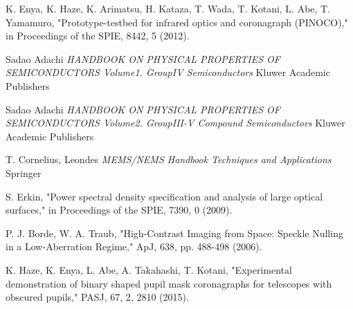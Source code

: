 \documentclass[a4paper]{article}
\begin{document}
\begin{thebibliography}{99}
K. Enya, K. Haze, K. Arimatsu, H. Kataza, T. Wada, T. Kotani, L. Abe, T. Yamamuro, "Prototype-testbed for infrared optics and coronagraph (PINOCO)," in Proceedings of the SPIE, 8442, 5 (2012).

Sadao Adachi
\textit{HANDBOOK ON PHYSICAL PROPERTIES OF SEMICONDUCTORS Volume1. GroupI\hspace{-.1em}V Semiconductors}
Kluwer Academic Publishers

Sadao Adachi
\textit{HANDBOOK ON PHYSICAL PROPERTIES OF SEMICONDUCTORS Volume2. GroupI\hspace{-.1em}I\hspace{-.1em}I-V Compound Semiconductors}
Kluwer Academic Publishers

T. Cornelius, Leondes
\textit{MEMS/NEMS Handbook Techniques and Applications}
Springer

S. Erkin, "Power spectral density specification and analysis of large optical surfaces," in Proceedings of the SPIE, 7390, 0 (2009).

P. J. Borde, W. A. Traub, "High-Contrast Imaging from Space: Speckle Nulling in a Low-Aberration Regime," ApJ, 638, pp. 488-498 (2006).

K. Haze, K. Enya, L. Abe, A. Takahashi, T. Kotani, "Experimental demonstration of binary shaped pupil mask coronagraphs for telescopes with obscured pupils," PASJ, 67, 2, 2810 (2015).

\end{thebibliography}
\end{document}
